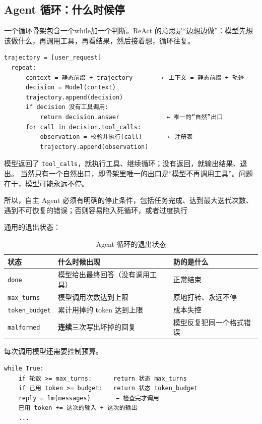 \subsection{Agent 循环：什么时候停}
一个循环骨架包含一个while加一个判断。ReAct 的意思是“边想边做”：模型先想该做什么，再调用工具，再看结果，然后接着想，循环往复。
\begin{lstlisting}[style=agentpython, caption={ReAct 循环}]
  trajectory = [user_request]
  repeat:
      context = 静态前缀 + trajectory        ← 上下文 = 静态前缀 + 轨迹
      decision = Model(context)
      trajectory.append(decision)
      if decision 没有工具调用:
          return decision.answer             ← 唯一的“自然”出口
      for call in decision.tool_calls:
          observation = 校验并执行(call)       ← 注册表
          trajectory.append(observation)
\end{lstlisting}
模型返回了 \texttt{tool\_calls}，就执行工具、继续循环；没有返回，就输出结果、退出。
当然只有一个自然出口，即骨架里唯一的出口是“模型不再调用工具”。问题在于，模型可能永远不停。\\


\begin{tcolorbox}[enhanced, sharp corners, boxrule=0pt, frame hidden,
                  borderline west={3pt}{0pt}{structurecolor},
                  colback=structurecolor!5]
所以，自主 Agent 必须有明确的停止条件，包括任务完成、达到最大迭代次数、遇到不可恢复的错误；否则容易陷入死循环，或者过度执行
\end{tcolorbox}
通用的退出状态：
\begin{table}[H]
\centering
\caption{Agent 循环的退出状态}
\label{tab:loop-status}
\begin{tabular}{p{2.8cm} p{6.2cm} p{5.6cm}}
  \toprule
  状态 & 什么时候出现 & 防的是什么 \\
  \midrule
  \texttt{done}          & 模型给出最终回答（没有调用工具） & 正常结束 \\
  \texttt{max\_turns}    & 模型调用次数达到上限 & 原地打转、永远不停 \\
  \texttt{token\_budget} & 累计用掉的 token 达到上限 & 成本失控 \\
  \texttt{malformed}     & \textbf{连续}三次写出坏掉的回复 & 模型反复犯同一个格式错误 \\
  \bottomrule
\end{tabular}
\end{table}

每次调用模型还需要控制预算。
\begin{lstlisting}[style=agentpython]
  while True:
    if 轮数 >= max_turns:      return 状态 max_turns
    if 已用 token >= budget:   return 状态 token_budget
    reply = lm(messages)       ← 检查完才调用
    已用 token += 这次的输入 + 这次的输出
    ...
\end{lstlisting}

